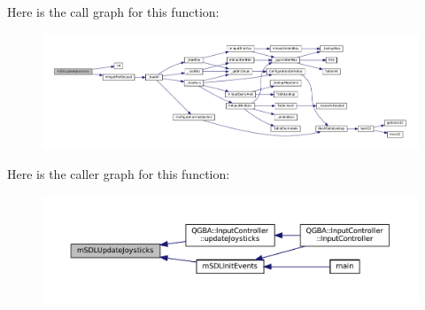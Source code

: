 Here is the call graph for this function\+:
\nopagebreak
\begin{figure}[H]
\begin{center}
\leavevmode
\includegraphics[width=350pt]{sdl-events_8h_a6174eb5a5de369faa9936c653489d8ee_cgraph}
\end{center}
\end{figure}
Here is the caller graph for this function\+:
\nopagebreak
\begin{figure}[H]
\begin{center}
\leavevmode
\includegraphics[width=350pt]{sdl-events_8h_a6174eb5a5de369faa9936c653489d8ee_icgraph}
\end{center}
\end{figure}
